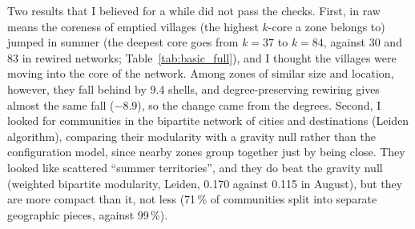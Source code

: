Two results that I believed for a while did not pass the checks. First, in raw means the coreness of emptied villages (the highest $k$-core a zone belongs to) jumped in summer (the deepest core goes from $k=37$ to $k=84$, against 30 and 83 in rewired networks; Table~\ref{tab:basic_full}), and I thought the villages were moving into the core of the network. Among zones of similar size and location, however, they fall behind by 9.4 shells, and degree-preserving rewiring gives almost the same fall ($-8.9$), so the change came from the degrees. Second, I looked for communities in the bipartite network of cities and destinations (Leiden algorithm), comparing their modularity with a gravity null rather than the configuration model, since nearby zones group together just by being close. They looked like scattered ``summer territories'', and they do beat the gravity null (weighted bipartite modularity, Leiden, 0.170 against 0.115 in August), but they are more compact than it, not less (71\,\% of communities split into separate geographic pieces, against 99\,\%).
